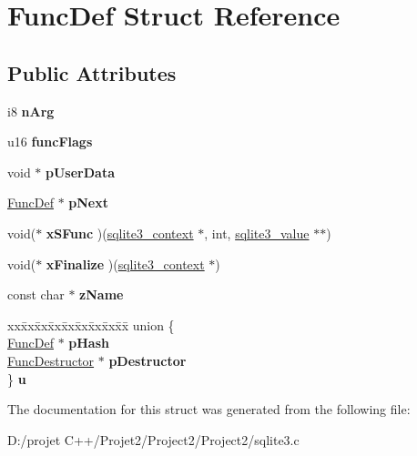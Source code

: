 \hypertarget{struct_func_def}{}\section{Func\+Def Struct Reference}
\label{struct_func_def}
\subsection*{Public Attributes}
\begin{DoxyCompactItemize}
\item 
\mbox{\label{struct_func_def_a65d2af5dc68a0344efb368b8ce1b9141}} 
i8 {\bfseries n\+Arg}
\item 
\mbox{\label{struct_func_def_a4cd12fdb0da08ec8a5fb41f8bcd09e78}} 
u16 {\bfseries func\+Flags}
\item 
\mbox{\label{struct_func_def_a04fdde2f96be198823a483bebcfd3ae3}} 
void $\ast$ {\bfseries p\+User\+Data}
\item 
\mbox{\label{struct_func_def_a1ebe547d000172d9ae44d12eeb433a48}} 
\mbox{\hyperlink{struct_func_def}{Func\+Def}} $\ast$ {\bfseries p\+Next}
\item 
\mbox{\label{struct_func_def_a64986fd7c3b2a3715f5e7a54c0ef385e}} 
void($\ast$ {\bfseries x\+S\+Func} )(\mbox{\hyperlink{structsqlite3__context}{sqlite3\+\_\+context}} $\ast$, int, \mbox{\hyperlink{structsqlite3__value}{sqlite3\+\_\+value}} $\ast$$\ast$)
\item 
\mbox{\label{struct_func_def_a2315fa9b1a173dca2ba0c506548b83f9}} 
void($\ast$ {\bfseries x\+Finalize} )(\mbox{\hyperlink{structsqlite3__context}{sqlite3\+\_\+context}} $\ast$)
\item 
\mbox{\label{struct_func_def_ac732c25b31e5c5a5390db76e74724024}} 
const char $\ast$ {\bfseries z\+Name}
\item 
\mbox{\label{struct_func_def_ab36713bccc04bb53700296ba7f7e954e}} 
\begin{tabbing}
xx\=xx\=xx\=xx\=xx\=xx\=xx\=xx\=xx\=\kill
union \{\\
\>\mbox{\hyperlink{struct_func_def}{FuncDef}} $\ast$ {\bfseries pHash}\\
\>\mbox{\hyperlink{struct_func_destructor}{FuncDestructor}} $\ast$ {\bfseries pDestructor}\\
\} {\bfseries u}\\

\end{tabbing}\end{DoxyCompactItemize}


The documentation for this struct was generated from the following file\+:\begin{DoxyCompactItemize}
\item 
D\+:/projet C++/\+Projet2/\+Project2/\+Project2/sqlite3.\+c\end{DoxyCompactItemize}
